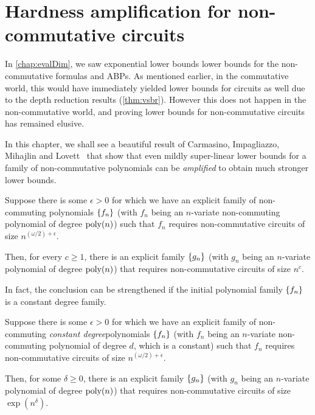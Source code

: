 \chapter{Hardness amplification for non-commutative circuits}
\label{chap:nc-hardness-amp}

In \autoref{chap:evalDim}, we saw exponential lower bounds lower bounds for the non-commutative formulas and ABPs. As mentioned earlier, in the commutative world, this would have immediately yielded lower bounds for circuits as well due to the depth reduction results (\autoref{thm:vsbr}). However this does not happen in the non-commutative world, and proving lower bounds for non-commutative circuits has remained elusive.

In this chapter, we shall see a beautiful result of Carmasino, Impagliazzo, Mihajlin and Lovett~\cite{CILM18} that show that even mildly super-linear lower bounds for a family of non-commutative polynomials can be \emph{amplified} to obtain much stronger lower bounds.

\begin{theorem} \label{thm:CILM18-mainthm}
  Suppose there is some $\epsilon > 0$ for which we have an explicit family of non-commuting polynomials $\left\{f_n\right\}$ (with $f_n$ being an $n$-variate non-commuting polynomial of degree $\operatorname{poly}(n)$) such that $f_n$ requires non-commutative circuits of size $n^{(\omega/2) + \epsilon}$.

  Then, for every $c \geq 1$, there is an explicit family $\left\{g_n\right\}$ (with $g_n$ being an $n$-variate polynomial of degree $\operatorname{poly}(n)$) that requires non-commutative circuits of size $n^c$. 
\end{theorem}

In fact, the conclusion can be strengthened if the initial polynomial family $\left\{f_n\right\}$ is a constant degree family.

\begin{theorem} \label{thm:CILM18-mainthm-constdeg}
  Suppose there is some $\epsilon > 0$ for which we have an explicit family of non-commuting \emph{constant degree}polynomials $\left\{f_n\right\}$ (with $f_n$ being an $n$-variate non-commuting polynomial of degree $d$, which is a constant) such that $f_n$ requires non-commutative circuits of size $n^{(\omega/2) + \epsilon}$.

  Then, for some $\delta \geq 0$, there is an explicit family $\left\{g_n\right\}$ (with $g_n$ being an $n$-variate polynomial of degree $\operatorname{poly}(n)$) that requires non-commutative circuits of size $\exp(n^{\delta})$. 
\end{theorem}

